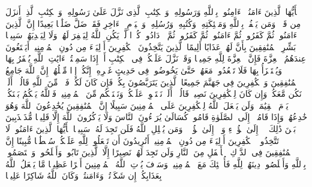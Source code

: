 \stopbuffer
\startbuffer[\q:4:136]
یَٰۤأَیُّهَا ٱلَّذِینَ ءَامَنُوۤا۟ ءَامِنُوا۟ بِٱللَّهِ وَرَسُولِهِۦ وَٱلۡكِتَٰبِ ٱلَّذِی نَزَّلَ عَلَىٰ رَسُولِهِۦ وَٱلۡكِتَٰبِ ٱلَّذِیۤ أَنزَلَ مِن قَبۡلُۚ وَمَن یَكۡفُرۡ بِٱللَّهِ وَمَلَٰۤئِكَتِهِۦ وَكُتُبِهِۦ وَرُسُلِهِۦ وَٱلۡیَوۡمِ ٱلۡءَاخِرِ فَقَدۡ ضَلَّ ضَلَٰلَۢا بَعِیدًا%
\stopbuffer
\startbuffer[\q:4:137]
إِنَّ ٱلَّذِینَ ءَامَنُوا۟ ثُمَّ كَفَرُوا۟ ثُمَّ ءَامَنُوا۟ ثُمَّ كَفَرُوا۟ ثُمَّ ٱزۡدَادُوا۟ كُفۡرࣰا لَّمۡ یَكُنِ ٱللَّهُ لِیَغۡفِرَ لَهُمۡ وَلَا لِیَهۡدِیَهُمۡ سَبِیلَۢا%
\stopbuffer
\startbuffer[\q:4:138]
بَشِّرِ ٱلۡمُنَٰفِقِینَ بِأَنَّ لَهُمۡ عَذَابًا أَلِیمًا%
\stopbuffer
\startbuffer[\q:4:139]
ٱلَّذِینَ یَتَّخِذُونَ ٱلۡكَٰفِرِینَ أَوۡلِیَاۤءَ مِن دُونِ ٱلۡمُؤۡمِنِینَۚ أَیَبۡتَغُونَ عِندَهُمُ ٱلۡعِزَّةَ فَإِنَّ ٱلۡعِزَّةَ لِلَّهِ جَمِیعࣰا%
\stopbuffer
\startbuffer[\q:4:140]
وَقَدۡ نَزَّلَ عَلَیۡكُمۡ فِی ٱلۡكِتَٰبِ أَنۡ إِذَا سَمِعۡتُمۡ ءَایَٰتِ ٱللَّهِ یُكۡفَرُ بِهَا وَیُسۡتَهۡزَأُ بِهَا فَلَا تَقۡعُدُوا۟ مَعَهُمۡ حَتَّىٰ یَخُوضُوا۟ فِی حَدِیثٍ غَیۡرِهِۦۤ إِنَّكُمۡ إِذࣰا مِّثۡلُهُمۡۗ إِنَّ ٱللَّهَ جَامِعُ ٱلۡمُنَٰفِقِینَ وَٱلۡكَٰفِرِینَ فِی جَهَنَّمَ جَمِیعًا%
\stopbuffer
\startbuffer[\q:4:141]
ٱلَّذِینَ یَتَرَبَّصُونَ بِكُمۡ فَإِن كَانَ لَكُمۡ فَتۡحࣱ مِّنَ ٱللَّهِ قَالُوۤا۟ أَلَمۡ نَكُن مَّعَكُمۡ وَإِن كَانَ لِلۡكَٰفِرِینَ نَصِیبࣱ قَالُوۤا۟ أَلَمۡ نَسۡتَحۡوِذۡ عَلَیۡكُمۡ وَنَمۡنَعۡكُم مِّنَ ٱلۡمُؤۡمِنِینَۚ فَٱللَّهُ یَحۡكُمُ بَیۡنَكُمۡ یَوۡمَ ٱلۡقِیَٰمَةِۗ وَلَن یَجۡعَلَ ٱللَّهُ لِلۡكَٰفِرِینَ عَلَى ٱلۡمُؤۡمِنِینَ سَبِیلًا%
\stopbuffer
\startbuffer[\q:4:142]
إِنَّ ٱلۡمُنَٰفِقِینَ یُخَٰدِعُونَ ٱللَّهَ وَهُوَ خَٰدِعُهُمۡ وَإِذَا قَامُوۤا۟ إِلَى ٱلصَّلَوٰةِ قَامُوا۟ كُسَالَىٰ یُرَاۤءُونَ ٱلنَّاسَ وَلَا یَذۡكُرُونَ ٱللَّهَ إِلَّا قَلِیلࣰا%
\stopbuffer
\startbuffer[\q:4:143]
مُّذَبۡذَبِینَ بَیۡنَ ذَٰلِكَ لَاۤ إِلَىٰ هَٰۤؤُلَاۤءِ وَلَاۤ إِلَىٰ هَٰۤؤُلَاۤءِۚ وَمَن یُضۡلِلِ ٱللَّهُ فَلَن تَجِدَ لَهُۥ سَبِیلࣰا%
\stopbuffer
\startbuffer[\q:4:144]
یَٰۤأَیُّهَا ٱلَّذِینَ ءَامَنُوا۟ لَا تَتَّخِذُوا۟ ٱلۡكَٰفِرِینَ أَوۡلِیَاۤءَ مِن دُونِ ٱلۡمُؤۡمِنِینَۚ أَتُرِیدُونَ أَن تَجۡعَلُوا۟ لِلَّهِ عَلَیۡكُمۡ سُلۡطَٰنࣰا مُّبِینًا%
\stopbuffer
\startbuffer[\q:4:145]
إِنَّ ٱلۡمُنَٰفِقِینَ فِی ٱلدَّرۡكِ ٱلۡأَسۡفَلِ مِنَ ٱلنَّارِ وَلَن تَجِدَ لَهُمۡ نَصِیرًا%
\stopbuffer
\startbuffer[\q:4:146]
إِلَّا ٱلَّذِینَ تَابُوا۟ وَأَصۡلَحُوا۟ وَٱعۡتَصَمُوا۟ بِٱللَّهِ وَأَخۡلَصُوا۟ دِینَهُمۡ لِلَّهِ فَأُو۟لَٰۤئِكَ مَعَ ٱلۡمُؤۡمِنِینَۖ وَسَوۡفَ یُؤۡتِ ٱللَّهُ ٱلۡمُؤۡمِنِینَ أَجۡرًا عَظِیمࣰا%
\stopbuffer
\startbuffer[\q:4:147]
مَّا یَفۡعَلُ ٱللَّهُ بِعَذَابِكُمۡ إِن شَكَرۡتُمۡ وَءَامَنتُمۡۚ وَكَانَ ٱللَّهُ شَاكِرًا عَلِیمࣰا%
\stopbuffer
\startbuffer[\q:4:148]
